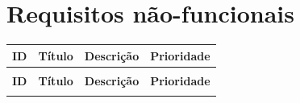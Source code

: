 \documentclass[
    12pt,
    oneside,
    a4paper,
    brazil
]{abntex2}
\begin{document}
\section{Requisitos não-funcionais}
\begin{xltabular}{\textwidth}{>{\raggedright\arraybackslash}p{1.2cm} >{\raggedright\arraybackslash}p{2.7cm} X >{\raggedleft\arraybackslash}p{2cm}}
    \label{tab:requisitos_nao_func} \\

    \toprule
    \textbf{ID} & \textbf{Título} & \textbf{Descrição} & \textbf{Prioridade} \\
    \midrule
    \endfirsthead

     \\
    \toprule
    \textbf{ID} & \textbf{Título} & \textbf{Descrição} & \textbf{Prioridade} \\
    \midrule
    \endhead

    \midrule
    \endfoot

    \bottomrule
    \endlastfoot


\end{xltabular}
\end{document}
